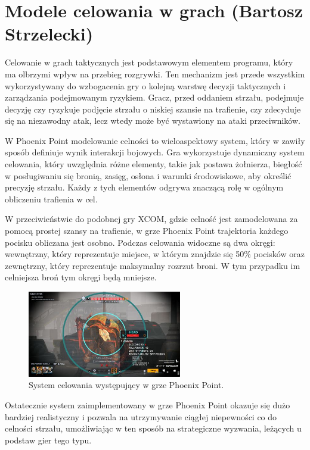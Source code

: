 \section{Modele celowania w grach (Bartosz Strzelecki)}\label{s:cel}
Celowanie w grach taktycznych jest podstawowym elementem programu, który ma
olbrzymi wpływ na przebieg rozgrywki. Ten mechanizm jest przede wszystkim wykorzystywany
do wzbogacenia gry o kolejną warstwę decyzji taktycznych i zarządzania podejmowanym ryzykiem.
Gracz, przed oddaniem strzału, podejmuje decyzję czy ryzykuje podjęcie strzału o niskiej szansie
na trafienie, czy zdecyduje się na niezawodny atak, lecz wtedy może być wystawiony na ataki przeciwników.

W Phoenix Point modelowanie celności to wieloaspektowy system, który w zawiły sposób definiuje wynik interakcji bojowych. 
Gra wykorzystuje dynamiczny system celowania, który uwzględnia różne elementy, takie jak postawa żołnierza, biegłość w posługiwaniu się bronią, zasięg, 
osłona i warunki środowiskowe, aby określić precyzję strzału. Każdy z tych elementów odgrywa znaczącą rolę w ogólnym obliczeniu trafienia w cel.

W przeciwieństwie do podobnej gry XCOM, gdzie celność jest zamodelowana za pomocą prostej szansy na trafienie, w grze Phoenix Point
trajektoria każdego pocisku obliczana jest osobno. Podczas celowania widoczne są dwa okręgi: wewnętrzny, który reprezentuje miejsce,
w którym znajdzie się 50\% pocisków oraz zewnętrzny, który reprezentuje maksymalny rozrzut broni. W tym przypadku im celniejsza broń tym
okręgi będą mniejsze.

\begin{figure}[h]
\centering
\includegraphics[width=0.6\textwidth]{images/point}
\caption{System celowania występujący w grze Phoenix Point.}
\label{fig:acc}
\end{figure}

Ostatecznie system zaimplementowany w grze Phoenix Point okazuje się dużo bardziej realistyczny i pozwala na utrzymywanie ciągłej niepewności
co do celności strzału, umożliwiając w ten sposób na strategiczne wyzwania, leżących u podstaw gier tego typu. 
